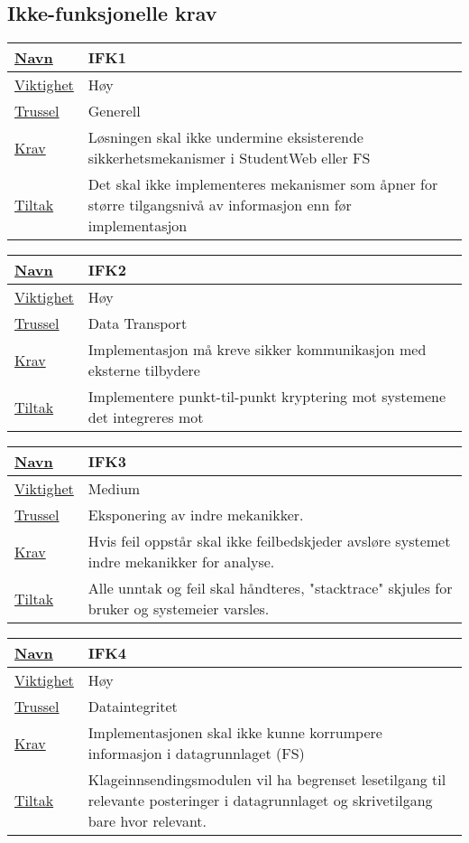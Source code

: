 \subsection{Ikke-funksjonelle krav}

\begin{tabularx}{\textwidth}{|l|X|}
  \hline
  \underline{Navn} & IFK1 \\ \hline
  \underline{Viktighet} & Høy \\ \hline
  \underline{Trussel} & Generell \\ \hline
  \underline{Krav} & Løsningen skal ikke undermine eksisterende sikkerhetsmekanismer i StudentWeb eller FS \\ \hline
  \underline{Tiltak} & Det skal ikke implementeres mekanismer som åpner for større tilgangsnivå av informasjon enn før implementasjon \\ \hline
\end{tabularx}

\begin{tabularx}{\textwidth}{|l|X|}
  \hline
  \underline{Navn} & IFK2 \\ \hline
  \underline{Viktighet} & Høy \\ \hline
  \underline{Trussel} & Data Transport \\ \hline
  \underline{Krav} & Implementasjon må kreve sikker kommunikasjon med eksterne tilbydere \\ \hline
  \underline{Tiltak} & Implementere punkt-til-punkt kryptering mot systemene det integreres mot \\ \hline
\end{tabularx}

\begin{tabularx}{\textwidth}{|l|X|}
  \hline
  \underline{Navn} & IFK3 \\ \hline
  \underline{Viktighet} & Medium \\ \hline
  \underline{Trussel} & Eksponering av indre mekanikker. \\ \hline
  \underline{Krav} & Hvis feil oppstår skal ikke feilbedskjeder avsløre systemet indre mekanikker for analyse. \\ \hline
  \underline{Tiltak} & Alle unntak og feil skal håndteres, "stacktrace" skjules for bruker og systemeier varsles. \\ \hline
\end{tabularx}

\begin{tabularx}{\textwidth}{|l|X|}
  \hline
  \underline{Navn} & IFK4 \\ \hline
  \underline{Viktighet} & Høy \\ \hline
  \underline{Trussel} & Dataintegritet \\ \hline
  \underline{Krav} & Implementasjonen skal ikke kunne korrumpere informasjon i datagrunnlaget (FS) \\ \hline
  \underline{Tiltak} & Klageinnsendingsmodulen vil ha begrenset lesetilgang til relevante posteringer i datagrunnlaget og skrivetilgang bare hvor relevant. \\ \hline
\end{tabularx}

